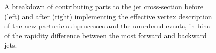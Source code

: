 \begin{figure}[H]
\caption{A breakdown of contributing parts to the jet cross-section before (left) and after (right) implementing the effective vertex description of the new partonic subprocesses and the unordered events, in bins of the rapidity difference between the most forward and backward jets.}
\label{fig:fklmigration3}
\end{figure}

